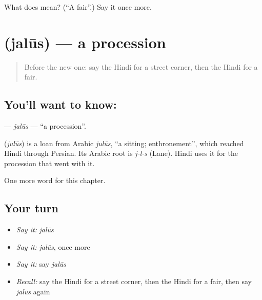 \begin{tcolorbox}[breakable,colback=teal!4,colframe=teal!35!black,title={Before you move on}]
What does  mean? (\textquotedblleft{}A fair\textquotedblright{}.) Say it once more.
\end{tcolorbox}
\section[\texorpdfstring{\hi{जुलूस} (jalūs)}{जुलूस (jalūs)}]{ (jalūs) — a procession}

\label{lesson:HI-C272-jalus}



\begin{quote}
Before the new one: say the Hindi for a street corner, then the Hindi for a fair.
\end{quote}

\subsection*{You'll want to know: }
\textbf{} — \emph{jalūs} — \textquotedblleft{}a procession\textquotedblright{}.

\begin{cousinweb}
\textbf{} (\emph{julūs}) is a loan from Arabic \emph{julūs}, \textquotedblleft{}a sitting; enthronement\textquotedblright{}, which reached Hindi through Persian. Its Arabic root is \emph{j-l-s} (Lane). Hindi uses it for the procession that went with it.
\end{cousinweb}

\begin{grammarlens}[title={What you've built}]
One more word for this chapter.
\end{grammarlens}

\subsection*{Your turn}
\begin{itemize}
\raggedright
  \item \emph{Say it:} \emph{jalūs}
  \item \emph{Say it:} \emph{jalūs}, once more
  \item \emph{Say it:} say \emph{jalūs}
  \item \emph{Recall:} say the Hindi for a street corner, then the Hindi for a fair, then say \emph{jalūs} again
\end{itemize}

